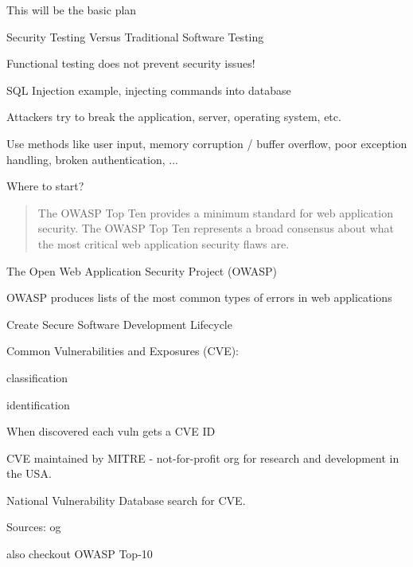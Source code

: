 \documentclass[Screen16to9,17pt]{foils}
\begin{document}
\vskip 1cm
This will be the basic plan






\begin{list2}
\item Security Testing Versus Traditional Software Testing
\item Functional testing does not prevent security issues!
\item SQL Injection example, injecting commands into database
\item Attackers try to break the application, server, operating system, etc.
\item Use methods like user input, memory corruption / buffer overflow, poor exception handling, broken authentication, ...
\end{list2}

\vskip 2cm
\centerline{\LARGE Where to start?}



\begin{quote}
The OWASP Top Ten provides a minimum standard for web application
security. The OWASP Top Ten represents a broad consensus about what
the most critical web application security flaws are.
\end{quote}

\begin{list1}
\item The Open Web Application Security Project (OWASP)
\item OWASP produces lists of the most common types of errors in web applications
\item {}
\item Create Secure Software Development Lifecycle
\end{list1}




\begin{list1}
\item Common Vulnerabilities and Exposures (CVE):
  \begin{list2}
  \item classification
  \item identification
  \end{list2}
\item When discovered each vuln gets a CVE ID
\item CVE maintained by MITRE - not-for-profit
org for research and development in the USA.
\item National Vulnerability Database search for CVE.
\item Sources:  og 
\item also checkout OWASP Top-10 
\end{list1}
\end{document}
